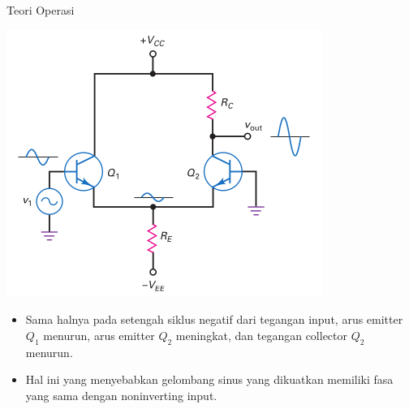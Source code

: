 \documentclass[aspectratio=169]{beamer}
\begin{document}
\begin{frame}{Teori Operasi}
	\begin{multicols}{2}
		\begin{center}
			\includegraphics[height=0.7\textheight]{gambar/01.noninverting-input+single-ended-output_AC}
		\end{center}
		\columnbreak
		\begin{itemize}
			\item Sama halnya pada setengah siklus negatif dari tegangan input, arus emitter $ Q_1 $ menurun, arus emitter $ Q_2 $ meningkat, dan tegangan collector $ Q_2 $ menurun.
			\item Hal ini yang menyebabkan gelombang sinus yang dikuatkan memiliki fasa yang sama dengan noninverting input.
		\end{itemize}
	\end{multicols}
\end{frame}
\end{document}
